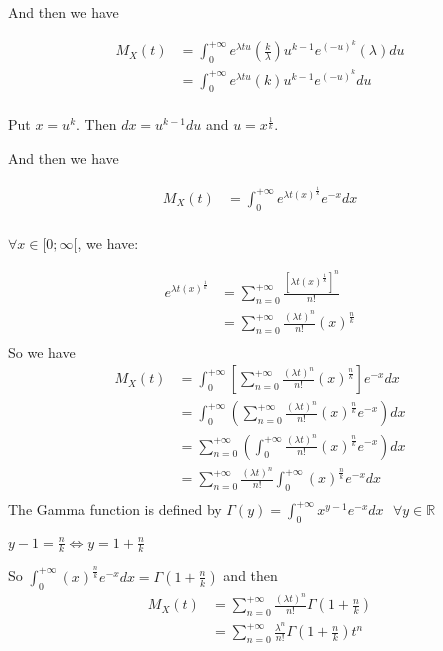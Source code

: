 \documentclass[11pt]{article}
\begin{document}
And then we have

\begin{align*}
M_X(t)  
        &=\int_{0}^{+\infty} e^{\lambda tu}(\frac{k}{\lambda})u^{k-1}e^{(-u)^{k}}(\lambda)du \\
         &=\int_{0}^{+\infty} e^{\lambda tu}(k)u^{k-1}e^{(-u)^{k}}du \\
\end{align*}

Put $x=u^k$. Then $dx=u^{k-1}du$  and $u=x^{\frac{1}{k}}$.

And then we have

\begin{align*}
M_X(t)  
        &=\int_{0}^{+\infty} e^{\lambda t(x)^{\frac{1}{k}}}e^{-x}dx \\
\end{align*}

$\forall x  \in [0;\infty[$, we have:


\begin{align*}
e^{\lambda t(x)^{\frac{1}{k}}}  
        &=\sum_{n=0}^{+\infty} \frac{[{\lambda t(x)^{\frac{1}{k}}}]^n}{n!} \\
         &=\sum_{n=0}^{+\infty} \frac{({\lambda t})^n}{n!} (x)^{\frac{n}{k}} \\
\end{align*}
So we have
\begin{align*}
M_X(t)  
        &=\int_{0}^{+\infty} [\sum_{n=0}^{+\infty} \frac{({\lambda t})^n}{n!} (x)^{\frac{n}{k}}] e^{-x}dx \\
        &=\int_{0}^{+\infty} (\sum_{n=0}^{+\infty} \frac{({\lambda t})^n}{n!} (x)^{\frac{n}{k}} e^{-x})dx \\
        &=\sum_{n=0}^{+\infty} (\int_{0}^{+\infty} \frac{({\lambda t})^n}{n!} (x)^{\frac{n}{k}} e^{-x})dx \\
        &=\sum_{n=0}^{+\infty} \frac{({\lambda t})^n}{n!} \int_{0}^{+\infty}  (x)^{\frac{n}{k}} e^{-x}dx \\
\end{align*}
The Gamma function is defined by $\Gamma(y)=\int_{0}^{+\infty} x^{y-1} e^{-x}dx \text{ } \forall y \in \mathbb{R}$

$y-1=\frac{n}{k} \iff y=1+\frac{n}{k}$

So  $\int_{0}^{+\infty}  (x)^{\frac{n}{k}} e^{-x}dx=\Gamma(1+\frac{n}{k})$ and then
\begin{align*}
M_X(t)  
        &=\sum_{n=0}^{+\infty} \frac{({\lambda t})^n}{n!} \Gamma(1+\frac{n}{k}) \\
        &=\sum_{n=0}^{+\infty} \frac{{\lambda }^n}{n!} \Gamma(1+\frac{n}{k}) t^n \\
\end{align*}
\end{document}
